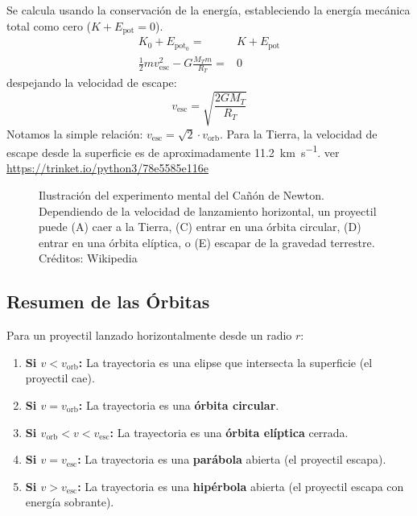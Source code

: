 \documentclass[11pt,a4paper]{book}
\begin{document}
 Se calcula usando la conservación de la energía, estableciendo la energía mecánica total como cero ($K+E_{\text{pot}}=0$).
\begin{align*}
K_0+E_{\text{pot}_0} =& K+E_{\text{pot}}\\
 \frac{1}{2}mv_{\text{esc}}^2 - G \frac{M_T m}{R_T} =& 0  
\end{align*}
 despejando la velocidad de escape:
\begin{equation}
    \boxed{ v_{\text{esc}} = \sqrt{\frac{2 G M_T}{R_T}} }
\end{equation}
Notamos la simple relación: $v_{\text{esc}} = \sqrt{2} \cdot v_{\text{orb}}$. Para la Tierra, la velocidad de escape desde la superficie es de aproximadamente \SI{11.2}{\kilo\meter\per\second}.
ver \url{https://trinket.io/python3/78e5585e116e}


\begin{figure}[h!]
    \centering
    

    \caption{Ilustración del experimento mental del Cañón de Newton. Dependiendo de la velocidad de lanzamiento horizontal, un proyectil puede (A) caer a la Tierra, (C) entrar en una órbita circular, (D) entrar en una órbita elíptica, o (E) escapar de la gravedad terrestre. Créditos: Wikipedia}
    \label{fig:canon_newton}
\end{figure}

\subsection*{Resumen de las Órbitas}
Para un proyectil lanzado horizontalmente desde un radio $r$:
\begin{enumerate}
    \item \textbf{Si $v < v_{\text{orb}}$:} La trayectoria es una elipse que intersecta la superficie (el proyectil cae).
    \item \textbf{Si $v = v_{\text{orb}}$:} La trayectoria es una \textbf{órbita circular}.
    \item \textbf{Si $v_{\text{orb}} < v < v_{\text{esc}}$:} La trayectoria es una \textbf{órbita elíptica} cerrada.
    \item \textbf{Si $v = v_{\text{esc}}$:} La trayectoria es una \textbf{parábola} abierta (el proyectil escapa).
    \item \textbf{Si $v > v_{\text{esc}}$:} La trayectoria es una \textbf{hipérbola} abierta (el proyectil escapa con energía sobrante).
\end{enumerate}
\end{document}

